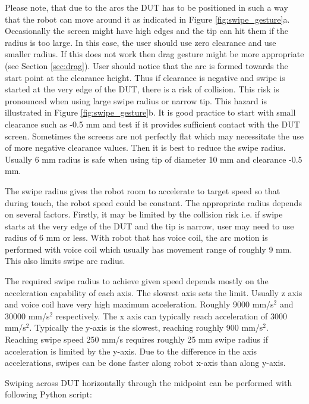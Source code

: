 Please note, that due to the arcs the DUT has to be positioned in such a way that the robot can move around it as indicated in Figure \ref{fig:swipe_gesture}a. Occasionally the screen might have high edges and the tip can hit them if the radius is too large. In this case, the user should use zero clearance and use smaller radius. If this does not work then drag gesture might be more appropriate (see Section \ref{sec:drag}). User should notice that the arc is formed towards the start point at the clearance height. Thus if clearance is negative and swipe is started at the very edge of the DUT, there is a risk of collision. This risk is pronounced when using large swipe radius or narrow  tip. This hazard is illustrated in Figure \ref{fig:swipe_gesture}b. It is good practice to start with small clearance such as -0.5 mm and test if it provides sufficient contact with the DUT screen. Sometimes the screens are not perfectly flat which may necessitate the use of more negative clearance values. Then it is best to reduce the swipe radius. Usually 6 mm radius is safe when using tip of diameter 10 mm and clearance -0.5 mm.

The swipe radius gives the robot room to accelerate to target speed so that during touch, the robot speed could be constant. The appropriate radius depends on several factors. Firstly, it may be limited by the collision risk i.e. if swipe starts at the very edge of the DUT and the tip is narrow, user may need to use radius of 6 mm or less. With robot that has voice coil, the arc motion is performed with voice coil which usually has movement range of roughly 9 mm. This also limits swipe arc radius.

The required swipe radius to achieve given speed depends mostly on the acceleration capability of each axis. The slowest axis sets the limit. Usually z axis and voice coil have very high maximum acceleration. Roughly 9000 mm/s$^2$ and 30000 mm/s$^2$ respectively. The x axis can typically reach acceleration of 3000 mm/s$^2$. Typically the y-axis is the slowest, reaching roughly 900 mm/s$^2$. Reaching swipe speed 250 mm/s requires roughly 25 mm swipe radius if acceleration is limited by the y-axis. Due to the difference in the axis accelerations, swipes can be done faster along robot x-axis than along y-axis.


Swiping across DUT horizontally through the midpoint can be performed with following Python script:

